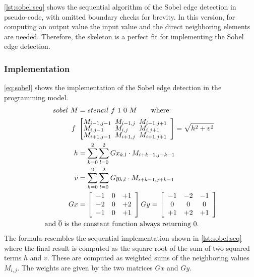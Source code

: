 \autoref{lst:sobel:seq} shows the sequential algorithm of the Sobel edge detection in pseudo-code, with omitted boundary checks for brevity.
In this version, for computing an output value  the input value  and the direct neighboring elements are needed.
Therefore, the \stencil skeleton is a perfect fit for implementing the Sobel edge detection.

\subsubsection*{\SkelCL Implementation}
\autoref{eq:sobel} shows the implementation of the Sobel edge detection in the \SkelCL programming model.
\begin{align}
  \label{eq:sobel}
  sobel\ M& = stencil\ f\ 1\ \overline{0}\ M \qquad\text{where:}\\
  f\ &\left[\begin{array}{lll}%
      \hspace{-.5em} M_{i-1,j-1}& \hspace{-.5em} M_{i-1,j} & \hspace{-.5em}M_{i-1,j+1}\vspace{-.25em}\\%
      \hspace{-.5em} M_{i,j-1}& \hspace{-.5em} M_{i,j} & \hspace{-.5em}M_{i,j+1}\vspace{-.25em}\\%
      \hspace{-.5em} M_{i+1,j-1}& \hspace{-.5em} M_{i+1,j} & \hspace{-.5em}M_{i+1,j+1}
    \end{array}\right] = \displaystyle\sqrt{ h^2 + v^2 }\nonumber\\
  h & = \sum_{k=0}^2 \sum_{l=0}^2 Gx_{k, l}\cdot M_{i+k-1,j+k-1}\nonumber\\
  v & = \sum_{k=0}^2 \sum_{l=0}^2 Gy_{k, l}\cdot M_{i+k-1,j+k-1}\nonumber\\
  Gx& = \left[\begin{array}{ccc}%
      -1&0&+1\\
      -2&0&+2\\
      -1&0&+1
    \end{array}\right]
  Gy = \left[\begin{array}{ccc}%
      -1&-2&-1\\
      0&0&0\\
      +1&+2&+1
    \end{array}\right] \nonumber\\
  \text{and } \overline{0} \text{ is th}&\text{e constant function always returning 0.}\nonumber
\end{align}
The formula resembles the sequential implementation shown in \autoref{lst:sobel:seq} where the final result is computed as the square root of the sum of two squared terms $h$ and $v$.
These are computed as weighted sums of the neighboring values $M_{i,j}$.
The weights are given by the two matrices $Gx$ and $Gy$.

